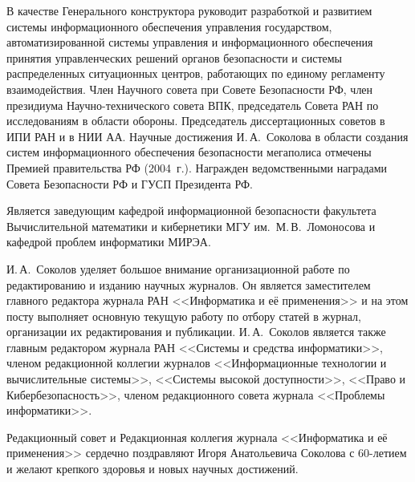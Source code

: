 \begin{multicols}{2}
В качестве Генерального конструктора руководит разработкой и развитием
системы информа\-ци\-онного обеспечения управления государством,
автоматизированной сис\-те\-мы управ\-ле\-ния и информационного обеспечения
принятия управленческих решений органов безопасности и системы распределенных
ситуационных центров, работа\-ющих по единому регламенту взаимодействия.
Член Научного совета при Совете Безопасности РФ, член президиума
На\-уч\-но-тех\-ни\-че\-ско\-го совета ВПК, председатель Совета РАН по
исследованиям в области обороны. Председатель диссертационных советов в ИПИ РАН
и в НИИ АА. Научные достижения И.\,А.~Соколова в области создания сис\-тем
информационного обеспечения безопасности мегаполиса отмечены Премией правительства
РФ (2004~г.). Награжден ведомственными наградами Совета Безопасности РФ и ГУСП
 Президента РФ.
 
    \thispagestyle{empty}

Является заведующим кафедрой информационной безопасности факультета Вычислительной математики и кибернетики МГУ им.\ М.\,В.~Ломоносова и кафедрой проблем информатики МИРЭА.

И.\,А.~Соколов уделяет большое внимание организационной работе по
редактированию и изданию научных журналов. Он является заместителем главного
редактора журнала РАН <<Информатика и её применения>> и на этом посту
выполняет основную текущую работу по отбору статей в журнал, организации их
редактирования и публикации. И.\,А.~Соколов является также главным редактором
журнала РАН <<Системы и средства информатики>>, членом редакционной
коллегии журналов <<Информационные технологии и вычислительные системы>>,
<<Сис\-те\-мы высокой доступности>>, <<Право и Кибер\-без\-опас\-ность>>, членом
редакционного совета журнала <<Проб\-ле\-мы информатики>>.

\bigskip

Редакционный совет и Редакционная коллегия журнала <<Информатика и её применения>> сердечно поздравляют Игоря Анатольевича Соколова с 60-ле\-ти\-ем и желают крепкого здоровья и новых научных достижений.




\end{multicols}

